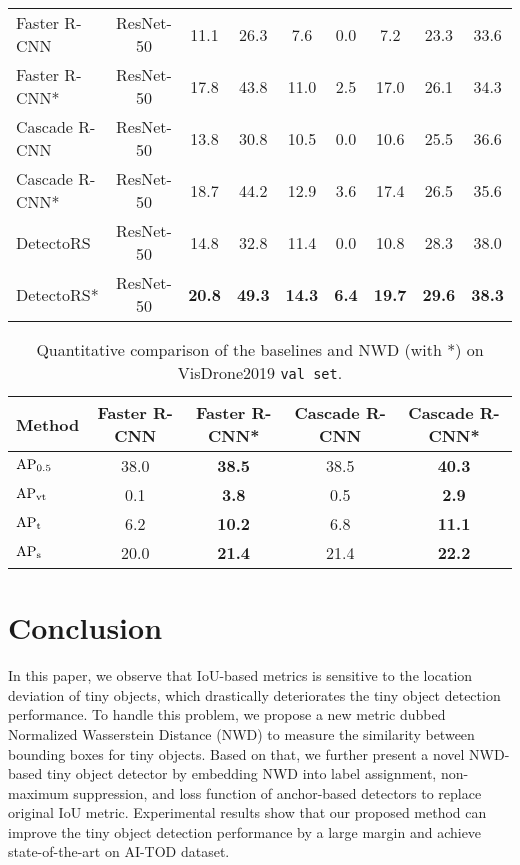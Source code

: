 \documentclass{article}
\begin{document}
\begin{table*}[t]
\begin{tabular}{|l|c|ccccccc|}
	 \hline
	 Faster R-CNN~\cite{Faster-R-CNN_2015_NIPS} & ResNet-50 	& 11.1	& 26.3  & 7.6  & 0.0 & 7.2 & 23.3 & 33.6   \\
	 Faster R-CNN*                              & ResNet-50 	& 17.8	& 43.8  & 11.0  & 2.5 & 17.0 & 26.1 & 34.3 \\
	 \hline
	 Cascade R-CNN~\cite{Cascade-R-CNN_2018_CVPR}& ResNet-50 	& 13.8	& 30.8  & 10.5 & 0.0 & 10.6 & 25.5 &  36.6 \\
	 Cascade R-CNN*                             & ResNet-50 	& 18.7	& 44.2  & 12.9 & 3.6 & 17.4 & 26.5 & 35.6 \\
	 \hline
	 DetectoRS~\cite{DetectoRS_2020_arXiv}      & ResNet-50 	& 14.8	& 32.8  & 11.4 & 0.0 & 10.8 & 28.3 & 38.0 \\
	 DetectoRS*                                 & ResNet-50 	& \textbf{20.8}	& \textbf{49.3}  & \textbf{14.3} & \textbf{6.4} & \textbf{19.7} & \textbf{29.6} & \textbf{38.3} \\
	\hline
	\end{tabular}
	\label{tab:baselines}
	\vspace{-2mm}
\end{table*}

\begin{table}
	\centering
	\setlength{\belowcaptionskip}{0.1cm}
	\renewcommand{\arraystretch}{0.92}
	\caption{Quantitative comparison of the baselines and NWD (with *) on VisDrone2019 {\tt val set}.}
	\begin{tabular}{|l|cc|cc|}  
	\hline
	Method  & Faster R-CNN & Faster R-CNN* & Cascade R-CNN & Cascade R-CNN*  \\
	\hline
	$\rm{AP_{0.5}}$  & 38.0 & \textbf{38.5} & 38.5 & \textbf{40.3} \\
	$\rm{AP_{vt}}$   & 0.1 & \textbf{3.8} & 0.5 & \textbf{2.9} \\
	$\rm{AP_{t}}$   & 6.2 & \textbf{10.2} & 6.8 & \textbf{11.1} \\
	$\rm{AP_{s}}$   & 20.0 & \textbf{21.4} & 21.4 & \textbf{22.2} \\
	\hline
	\end{tabular}
	\label{tab:visdrone}
	\vspace{-5mm}
\end{table}

\section{Conclusion}
In this paper, we observe that IoU-based metrics is sensitive to the location deviation of tiny objects, which drastically deteriorates the tiny object detection performance. To handle this problem, we propose a new metric dubbed Normalized Wasserstein Distance (NWD) to measure the similarity between bounding boxes for tiny objects. Based on that, we further present a novel NWD-based tiny object detector by embedding NWD into label assignment, non-maximum suppression, and loss function of anchor-based detectors to replace original IoU metric. Experimental results show that our proposed method can improve the tiny object detection performance by a large margin and achieve state-of-the-art on AI-TOD dataset. 





\medskip

{


}
\end{document}
